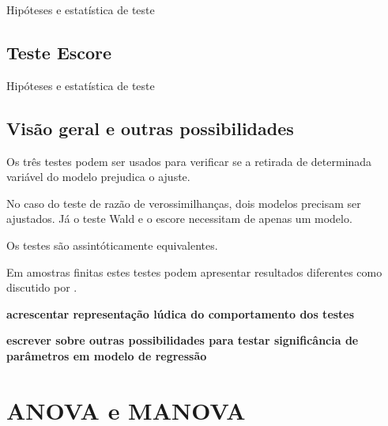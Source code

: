 Hipóteses e estatística de teste

\subsection{Teste Escore}

Hipóteses e estatística de teste

\subsection{Visão geral e outras possibilidades}

Os três testes podem ser usados para verificar se a retirada de determinada variável do modelo prejudica o ajuste. 

No caso do teste de razão de verossimilhanças, dois modelos precisam ser ajustados. Já o teste Wald e o escore necessitam de apenas um modelo. 

Os testes são assintóticamente equivalentes. 

Em amostras finitas estes testes podem apresentar resultados diferentes como discutido por \citet{conflict}.

\textbf{acrescentar representação lúdica do comportamento dos testes}

\textbf{escrever sobre outras possibilidades para testar significância de parâmetros em modelo de regressão}

\section{ANOVA e MANOVA}
